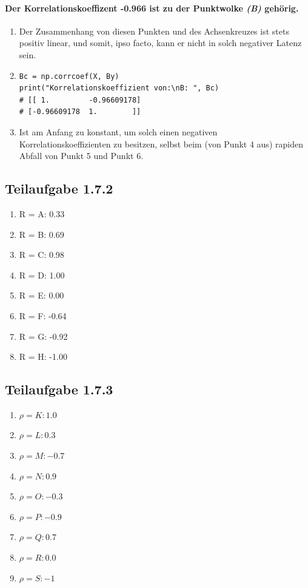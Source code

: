 \documentclass[a4paper,12pt]{article}
\begin{document}
	\paragraph{Der \textbf{Korrelationskoeffizent -0.966} ist zu der Punktwolke \textit{(B)} gehörig.}
	\begin{enumerate}
		\renewcommand{\labelenumi}{(\Alph{enumi})}
		\item Der Zusammenhang von diesen Punkten und des Achsenkreuzes ist stets positiv linear, und somit, ipso facto, kann er nicht in solch negativer Latenz sein.
		\item 
		\begin{lstlisting}
Bc = np.corrcoef(X, By)
print("Korrelationskoeffizient von:\nB: ", Bc) 
# [[ 1.         -0.96609178]
# [-0.96609178  1.        ]]
		\end{lstlisting}
		\item Ist am Anfang zu konstant, um solch einen negativen Korrelationskoeffizienten zu besitzen, selbst beim (von Punkt 4 aus) rapiden Abfall von Punkt 5 und Punkt 6.
	\end{enumerate}
	\subsection*{Teilaufgabe 1.7.2}
	\begin{enumerate}
		\item R = A: 0.33
		\item R = B: 0.69
		\item R = C: 0.98
		\item R = D: 1.00
		\item R = E: 0.00
		\item R = F: -0.64
		\item R = G: -0.92
		\item R = H: -1.00
	\end{enumerate}
	\subsection*{Teilaufgabe 1.7.3}
	\begin{enumerate}
		\item $\rho = K: 1.0$
		\item $\rho = L: 0.3$
		\item $\rho = M: -0.7$
		\item $\rho = N: 0.9$
		\item $\rho = O: -0.3$
		\item $\rho = P: -0.9$
		\item $\rho = Q: 0.7$
		\item $\rho = R: 0.0$
		\item $\rho = S: -1$
	\end{enumerate}
\end{document}
